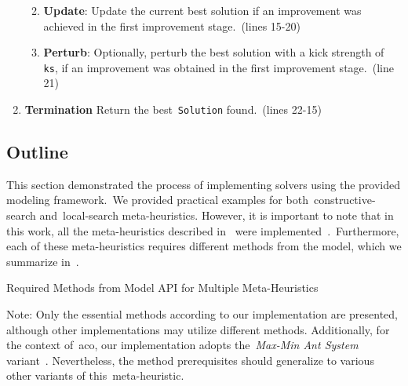 \begin{enumerate}
\begin{enumerate}
\begin{enumerate}
                        \end{enumerate}
                  \item \textbf{Update}: Update the current best solution if an improvement was achieved
                        in the first improvement stage.~(lines 15-20)
                  \item \textbf{Perturb}: Optionally, perturb the best solution with a
                        kick strength of \texttt{ks}, if an improvement was obtained in the
                        first improvement stage.~(line 21)
            \end{enumerate}
      \item \textbf{Termination} Return the best~\texttt{Solution} found.~(lines 22-15)
\end{enumerate}

\subsection{Outline}
\label{subsec:solver-outline}

This section demonstrated the process of implementing solvers using the provided
modeling framework.~We provided practical examples for
both~\acrshort{constructive-search} and~\acrshort{local-search} meta-heuristics.
However, it is important to note that in this work, all the meta-heuristics
described in~ were
implemented~\cite{rodriguesnasf4niopy}.~Furthermore, each of these
meta-heuristics requires different methods from the model, which we summarize
in~.

\begin{table}[h]
      \centering
      
      \caption{Required Methods from Model API for Multiple Meta-Heuristics}
      \caption*{\small Note: Only the essential methods according to our
            implementation are presented, although other implementations may utilize
            different methods. Additionally, for the context of~\acrshort{aco}, our
            implementation adopts the~\emph{Max-Min Ant System} variant~\cite{stutzle1999maxmin}. Nevertheless, the
            method prerequisites should generalize to various other variants of this~\acrshort{meta-heuristic}.}
      \label{tab:mh-api-methods}
\end{table}